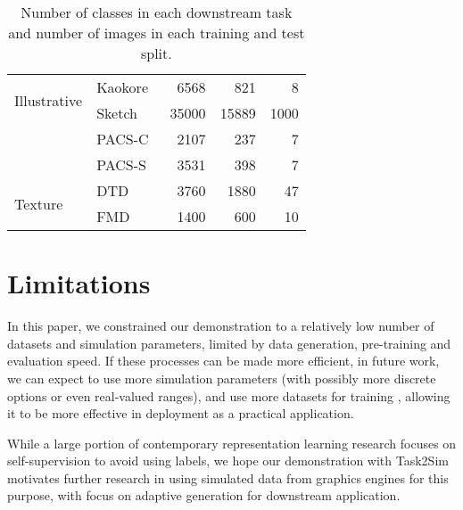 \begin{table}[h]
{\begin{tabular}{l| l|r r r }
        \midrule
        \multirow{2}{*}{Illustrative}
        & Kaokore~\cite{tian2020kaokore} & 6568 & 821 & 8 \\%
        & Sketch~\cite{wang2019learningsketch} & 35000 & 15889 & 1000 \\%
        & PACS-C~\cite{li2017deeperPACS} & 2107 & 237 & 7 \\%
        & PACS-S~\cite{li2017deeperPACS} & 3531 & 398 & 7 \\%
        \midrule
        \multirow{2}{*}{Texture}
        & DTD~\cite{cimpoi2014DTD} & 3760 & 1880 & 47 \\%
        & FMD~\cite{zhang2019poissonFMD} & 1400 & 600 & 10 \\%
        \bottomrule
    \end{tabular}
    }
    \caption{Number of classes in each downstream task and number of images in each training and test split.}
    \label{tab:dataset_details}
\end{table}








\section{Limitations} \label{sec:limitations}
In this paper, we constrained our demonstration to a relatively low number of datasets and simulation parameters, limited by data generation, pre-training and evaluation speed. If these processes can be made more efficient, in future work, we can expect to use more simulation parameters (with possibly more discrete options or even real-valued ranges), and use more datasets for training \ours, allowing it to be more effective in deployment as a practical application.

While a large portion of contemporary representation learning research focuses on self-supervision to avoid using labels, we hope our demonstration with Task2Sim motivates further research in using simulated data from graphics engines for this purpose, with focus on adaptive generation for downstream application. 

